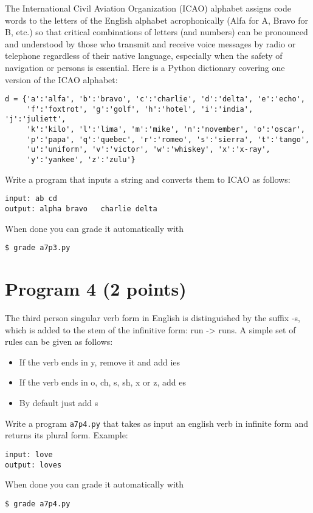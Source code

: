 \documentclass[12pt]{article}
\begin{document}
\noindent The International Civil Aviation Organization (ICAO) alphabet assigns code words to the letters of the English alphabet acrophonically (Alfa for A, Bravo for B, etc.) so that critical combinations of letters (and numbers) can be pronounced and understood by those who transmit and receive voice messages by radio or telephone regardless of their native language, especially when the safety of navigation or persons is essential. Here is a Python dictionary covering one version of the ICAO alphabet:
\begin{verbatim}
d = {'a':'alfa', 'b':'bravo', 'c':'charlie', 'd':'delta', 'e':'echo', 
     'f':'foxtrot', 'g':'golf', 'h':'hotel', 'i':'india', 'j':'juliett', 
     'k':'kilo', 'l':'lima', 'm':'mike', 'n':'november', 'o':'oscar', 
     'p':'papa', 'q':'quebec', 'r':'romeo', 's':'sierra', 't':'tango', 
     'u':'uniform', 'v':'victor', 'w':'whiskey', 'x':'x-ray', 
     'y':'yankee', 'z':'zulu'}
\end{verbatim}
Write a program that inputs a string and converts them to ICAO as follows:
\begin{verbatim}
input: ab cd
output: alpha bravo   charlie delta
\end{verbatim}

\noindent When done you can grade it automatically with
\begin{verbatim}
$ grade a7p3.py
\end{verbatim}

\section{Program 4 (2 points)}

\noindent
The third person singular verb form in English is distinguished by the suffix -s, which is added to the stem of the infinitive form: run -> runs. A simple set of rules can be given as follows:
\begin{itemize}
\item If the verb ends in y, remove it and add ies
\item If the verb ends in o, ch, s, sh, x or z, add es
\item By default just add s
\end{itemize}

Write a program {\tt a7p4.py} that takes as input an english verb in infinite form and returns its plural form. Example:
\begin{verbatim}
input: love
output: loves
\end{verbatim}
\noindent When done you can grade it automatically with
\begin{verbatim}
$ grade a7p4.py
\end{verbatim}
\end{document}
